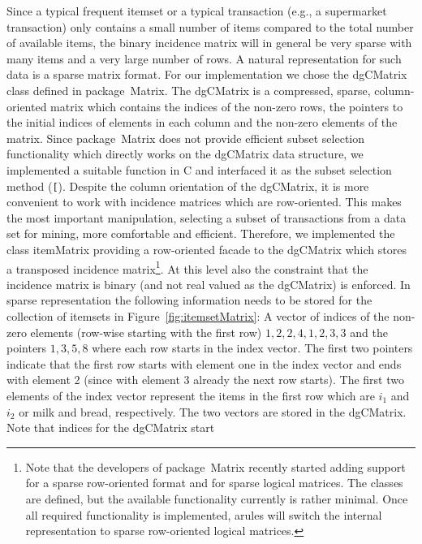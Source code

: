 \documentclass[10pt,a4paper]{article}
\newcommand{\strong}[1]{{\normalfont\fontseries{b}\selectfont #1}}
\newcommand{\class}[1]{\mbox{\textsf{#1}}}
\newcommand{\code}[1]{\mbox{\texttt{#1}}}
\newcommand{\pkg}[1]{\strong{#1}}
\newcommand{\proglang}[1]{\textsf{#1}}
\begin{document}
Since a typical frequent itemset or a typical transaction (e.g., a
supermarket transaction) only contains a small number of items compared
to the total number of available items, the binary incidence matrix will
in general be very sparse with many items and a very large number of
rows.  A natural representation for such data is a sparse matrix format.
For our implementation we chose the \class{dgCMatrix} class defined in
package~\pkg{Matrix}.  The \class{dgCMatrix} is a compressed, sparse,
column-oriented matrix which contains the indices of the non-zero rows,
the pointers to the initial indices of elements in each column and the
non-zero elements of the matrix.  Since package~\pkg{Matrix} does not
provide efficient subset selection functionality which directly works on
the \class{dgCMatrix} data structure, we implemented a suitable function
in \proglang{C} and interfaced it as the subset selection method
(\code{[}).  Despite the column orientation of the \class{dgCMatrix}, it
is more convenient to work with incidence matrices which are
row-oriented.  This makes the most important manipulation, selecting a
subset of transactions from a data set for mining, more comfortable and
efficient.  Therefore, we implemented the class \class{itemMatrix}
providing a row-oriented facade to the \class{dgCMatrix} which stores a
transposed incidence matrix\footnote{Note that the developers of
  package~\pkg{Matrix} recently started adding support for a sparse
  row-oriented format and for sparse logical matrices.  The classes are
  defined, but the available functionality currently is rather minimal.
  Once all required functionality is implemented, \pkg{arules} will
  switch the internal representation to sparse row-oriented logical
  matrices.}.  At this level also the constraint that the incidence
matrix is binary (and not real valued as the \class{dgCMatrix}) is
enforced.  In sparse representation the following information needs to
be stored for the collection of itemsets in
Figure~\ref{fig:itemsetMatrix}: A vector of indices of the non-zero
elements (row-wise starting with the first row) $1, 2, 2, 4, 1, 2, 3, 3$
and the pointers $1, 3, 5, 8$ where each row starts in the index vector.
The first two pointers indicate that the first row starts with element
one in the index vector and ends with element 2 (since with element 3
already the next row starts).  The first two elements of the index
vector represent the items in the first row which are $i_1$ and $i_2$ or
milk and bread, respectively.  The two vectors are stored in the
\class{dgCMatrix}. Note that indices for the \class{dgCMatrix} start
\end{document}

